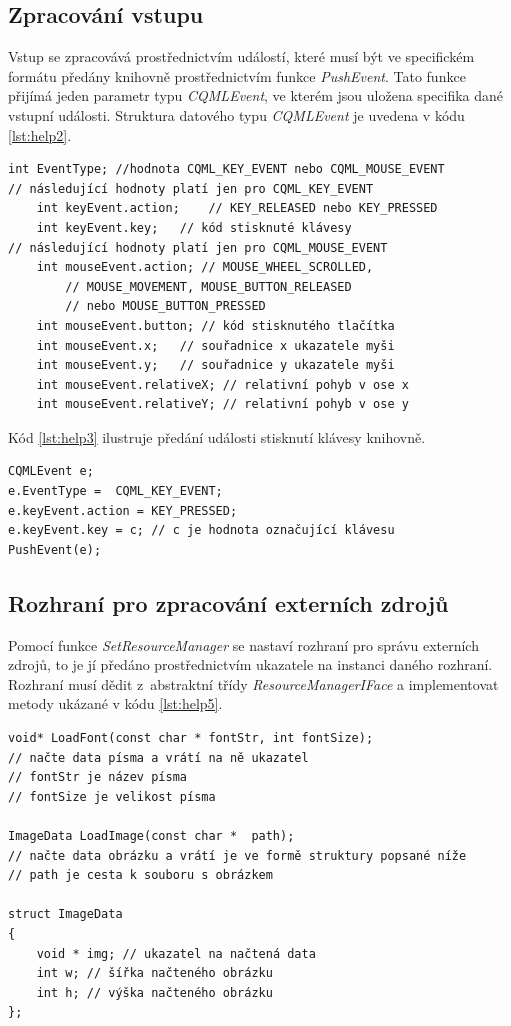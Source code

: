 \documentclass[11pt,twoside,a4paper]{book}
\begin{document}
\subsection{Zpracování vstupu}
Vstup se zpracovává prostřednictvím událostí, které musí být ve specifickém formátu předány knihovně prostřednictvím funkce \textit{PushEvent}. Tato funkce přijímá jeden parametr typu \textit{CQMLEvent}, ve kterém jsou uložena specifika dané vstupní události. Struktura datového typu \textit{CQMLEvent} je uvedena v kódu \ref{lst:help2}.
\begin{lstlisting}[float,frame=single,caption=Struktura datového typu \textit{CQMLEvent}.,label=lst:help2]
int EventType; //hodnota CQML_KEY_EVENT nebo CQML_MOUSE_EVENT
// následující hodnoty platí jen pro CQML_KEY_EVENT
	int keyEvent.action;	// KEY_RELEASED nebo KEY_PRESSED
	int keyEvent.key;	// kód stisknuté klávesy
// následující hodnoty platí jen pro CQML_MOUSE_EVENT
	int mouseEvent.action; // MOUSE_WHEEL_SCROLLED, 
		// MOUSE_MOVEMENT, MOUSE_BUTTON_RELEASED 
		// nebo MOUSE_BUTTON_PRESSED
	int mouseEvent.button; // kód stisknutého tlačítka
	int mouseEvent.x;	// souřadnice x ukazatele myši
	int mouseEvent.y;	// souřadnice y ukazatele myši
	int mouseEvent.relativeX; // relativní pohyb v ose x
	int mouseEvent.relativeY; // relativní pohyb v ose y
\end{lstlisting}
Kód \ref{lst:help3} ilustruje předání události stisknutí klávesy knihovně.
\begin{lstlisting}[float,frame=single,caption=Předání vstupu z klávesnice knihovně.,label=lst:help3]
CQMLEvent e;
e.EventType =  CQML_KEY_EVENT;
e.keyEvent.action = KEY_PRESSED;
e.keyEvent.key = c; // c je hodnota označující klávesu
PushEvent(e);
\end{lstlisting}

\subsection{\label{SEC:resI}Rozhraní pro zpracování externích zdrojů}
Pomocí funkce \textit{SetResourceManager} se nastaví rozhraní pro správu externích zdrojů, to je jí předáno prostřednictvím ukazatele na instanci daného rozhraní. Rozhraní musí dědit z~abstraktní třídy \textit{ResourceManagerIFace} a implementovat metody ukázané v kódu \ref{lst:help5}.
\begin{lstlisting}[float,frame=single,caption=Metody rozhraní pro správu externích zdrojů.,label=lst:help5]
void* LoadFont(const char * fontStr, int fontSize);
// načte data písma a vrátí na ně ukazatel
// fontStr je název písma
// fontSize je velikost písma

ImageData LoadImage(const char *  path);
// načte data obrázku a vrátí je ve formě struktury popsané níže
// path je cesta k souboru s obrázkem

struct ImageData
{
	void * img; // ukazatel na načtená data
	int w; // šířka načteného obrázku
	int h; // výška načteného obrázku
};
\end{lstlisting}
\end{document}
